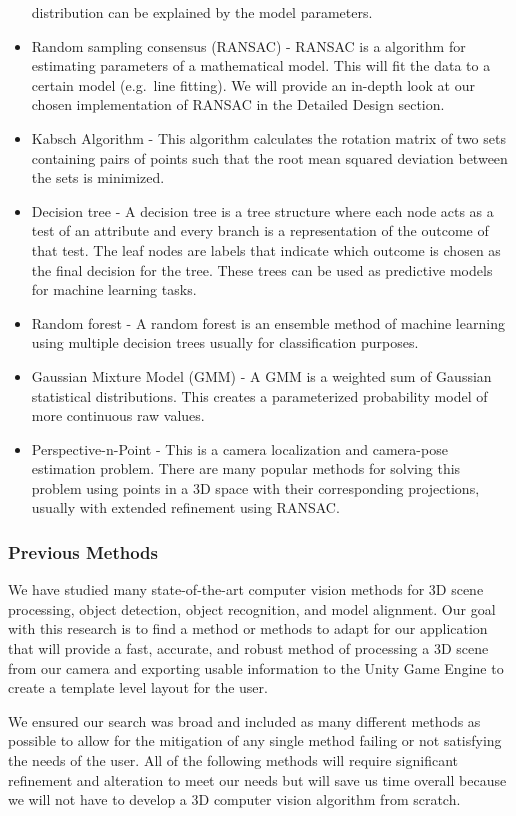 \documentclass[12pt]{article}
\begin{document}
\begin{itemize}
  distribution can be explained by the model parameters.
\item
  Random sampling consensus (RANSAC) - RANSAC is a algorithm for
  estimating parameters of a mathematical model. This will fit the data
  to a certain model (e.g.~line fitting). We will provide an in-depth
  look at our chosen implementation of RANSAC in the Detailed Design
  section.
\item
  Kabsch Algorithm - This algorithm calculates the rotation matrix of
  two sets containing pairs of points such that the root mean squared
  deviation between the sets is minimized.
\item
  Decision tree - A decision tree is a tree structure where each node
  acts as a test of an attribute and every branch is a representation of
  the outcome of that test. The leaf nodes are labels that indicate
  which outcome is chosen as the final decision for the tree. These
  trees can be used as predictive models for machine learning tasks.
\item
  Random forest - A random forest is an ensemble method of machine
  learning using multiple decision trees usually for classification
  purposes.
\item
  Gaussian Mixture Model (GMM) - A GMM is a weighted sum of Gaussian
  statistical distributions. This creates a parameterized probability
  model of more continuous raw values.
\item
  Perspective-n-Point - This is a camera localization and camera-pose
  estimation problem. There are many popular methods for solving this
  problem using points in a 3D space with their corresponding
  projections, usually with extended refinement using RANSAC.
\end{itemize}

\subsubsection{Previous Methods}\label{previous-methods}

We have studied many state-of-the-art computer vision methods for 3D
scene processing, object detection, object recognition, and model
alignment. Our goal with this research is to find a method or methods to
adapt for our application that will provide a fast, accurate, and robust
method of processing a 3D scene from our camera and exporting usable
information to the Unity Game Engine to create a template level layout
for the user.

We ensured our search was broad and included as many different methods
as possible to allow for the mitigation of any single method failing or
not satisfying the needs of the user. All of the following methods will
require significant refinement and alteration to meet our needs but will
save us time overall because we will not have to develop a 3D computer
vision algorithm from scratch.
\end{document}
